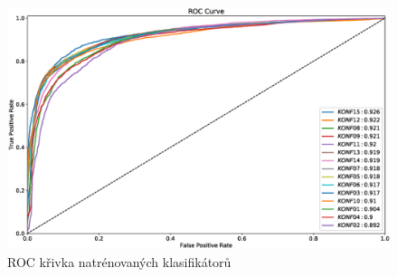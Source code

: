 \begin{figure}[H]
\centering
\includegraphics[width=16cm]{figures/roc1}
\caption{ROC křivka natrénovaných klasifikátorů}
\label{fig:rocCurve1}
\end{figure}

